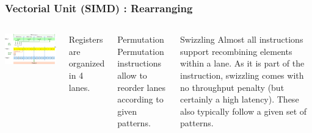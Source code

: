 \documentclass{beamer}
\begin{document}
\begin{frame}
  \frametitle{Vectorial Unit (SIMD) : Rearranging}

  \begin{columns}

    \hspace*{-.1\linewidth}\includegraphics[width=1.2\linewidth]{slides-figures/vect-swizzling.png}%
    
    
    Registers are organized in 4 lanes.

    \begin{block}{Permutation}
      Permutation instructions allow to reorder lanes according to
      given patterns.
    \end{block}
    
    \begin{block}{Swizzling}
      Almost all instructions support recombining elements within a
      lane. As it is part of the instruction, swizzling comes with no
      throughput penalty (but certainly a high latency). These also
      typically follow a given set of patterns.
    \end{block}
  \end{columns}
\end{frame}
\end{document}
